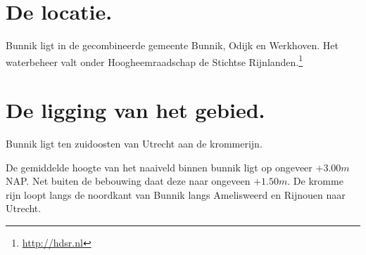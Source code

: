 \section{De locatie.}
Bunnik ligt in de gecombineerde gemeente Bunnik, Odijk en Werkhoven.
Het waterbeheer valt onder Hoogheemraadschap de Stichtse Rijnlanden.\footnote{\url{http://hdsr.nl}}

\section{De ligging van het gebied.}
Bunnik ligt ten zuidoosten van Utrecht aan de krommerijn.

De gemiddelde hoogte van het naaiveld binnen bunnik ligt op ongeveer $+3.00 m$ NAP.
Net buiten de bebouwing daat deze naar ongeveen $+1.50 m$.
De kromme rijn loopt langs de noordkant van Bunnik langs Amelisweerd en Rijnouen naar Utrecht.
